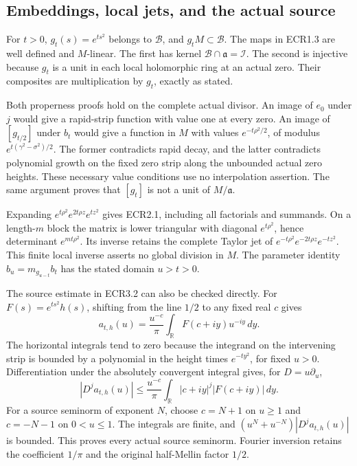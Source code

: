 \subsection{Embeddings, local jets, and the actual
source}\label{embeddings-local-jets-and-the-actual-source}

For \(t>0\), \(g_t(s)=e^{ts^2}\) belongs to \(\mathcal B\), and
\(g_tM\subset\mathcal B\). The maps in ECR1.3 are well defined and
\(M\)-linear. The first has kernel
\(\mathcal B\cap\mathfrak a=\mathcal I\). The second is injective
because \(g_t\) is a unit in each local holomorphic ring at an actual
zero. Their composites are multiplication by \(g_t\), exactly as stated.

Both properness proofs hold on the complete actual divisor. An image of
\(e_0\) under \(j\) would give a rapid-strip function with value one at
every zero. An image of \([g_{t/2}]\) under \(b_t\) would give a
function in \(M\) with values \(e^{-t\rho^2/2}\), of modulus
\(e^{t(\gamma^2-\sigma^2)/2}\). The former contradicts rapid decay, and
the latter contradicts polynomial growth on the fixed zero strip along
the unbounded actual zero heights. These necessary value conditions use
no interpolation assertion. The same argument proves that \([g_t]\) is
not a unit of \(M/\mathfrak a\).

Expanding \(e^{t\rho^2}e^{2t\rho z}e^{tz^2}\) gives ECR2.1, including
all factorials and summands. On a length-\(m\) block the matrix is lower
triangular with diagonal \(e^{t\rho^2}\), hence determinant
\(e^{mt\rho^2}\). Its inverse retains the complete Taylor jet of
\(e^{-t\rho^2}e^{-2t\rho z}e^{-tz^2}\). This finite local inverse
asserts no global division in \(M\). The parameter identity
\(b_u=m_{g_{u-t}}b_t\) has the stated domain \(u>t>0\).

The source estimate in ECR3.2 can also be checked directly. For
\(F(s)=e^{ts^2}h(s)\), shifting from the line \(1/2\) to any fixed real
\(c\) gives \[
a_{t,h}(u)=\frac{u^{-c}}\pi\int_{\mathbb R}F(c+iy)u^{-iy}\,dy.
\tag{ECRA1}
\] The horizontal integrals tend to zero because the integrand on the
intervening strip is bounded by a polynomial in the height times
\(e^{-ty^2}\), for fixed \(u>0\). Differentiation under the absolutely
convergent integral gives, for \(D=u\partial_u\), \[
|D^j a_{t,h}(u)|\le\frac{u^{-c}}\pi
\int_{\mathbb R}|c+iy|^j|F(c+iy)|\,dy.
\tag{ECRA2}
\] For a source seminorm of exponent \(N\), choose \(c=N+1\) on
\(u\ge1\) and \(c=-N-1\) on \(0<u\le1\). The integrals are finite, and
\((u^N+u^{-N})|D^j a_{t,h}(u)|\) is bounded. This proves every actual
source seminorm. Fourier inversion retains the coefficient \(1/\pi\) and
the original half-Mellin factor \(1/2\).

